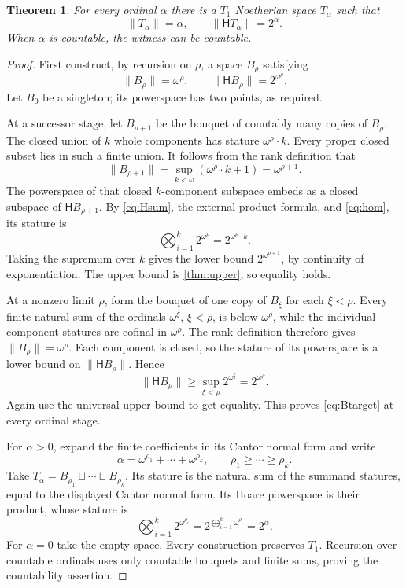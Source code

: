 \documentclass[11pt,a4paper]{article}
\newtheorem{theorem}{Theorem}[section]
\theoremstyle{definition}
\newcommand{\HH}{\mathsf H}
\newcommand{\st}[1]{\lVert #1\rVert}
\newcommand{\ds}{\mathbin{\sqcup}}
\newcommand{\natsum}{\mathop{\bigoplus}}
\newcommand{\natprod}{\mathop{\bigotimes}}
\numberwithin{equation}{section}
\begin{document}
\begin{theorem}\label{thm:sharpT1}
For every ordinal $\alpha$ there is a $T_1$ Noetherian space $T_\alpha$
such that
\[
 \st{T_\alpha}=\alpha,
 \qquad \st{\HH T_\alpha}=2^\alpha.
\]
When $\alpha$ is countable, the witness can be countable.
\end{theorem}
\begin{proof}
First construct, by recursion on $\rho$, a space $B_\rho$ satisfying
\begin{equation}\label{eq:Btarget}
 \st{B_\rho}=\omega^\rho,
 \qquad\st{\HH B_\rho}=2^{\omega^\rho}.
\end{equation}
Let $B_0$ be a singleton; its powerspace has two points, as required.

At a successor stage, let $B_{\rho+1}$ be the bouquet of countably many
copies of $B_\rho$.  The closed union of $k$ whole components has stature
$\omega^\rho\cdot k$.  Every proper closed subset lies in such a finite
union.  It follows from the rank definition that
\[
 \st{B_{\rho+1}}
 =\sup_{k<\omega}(\omega^\rho\cdot k+1)=\omega^{\rho+1}.
\]
The powerspace of that closed $k$-component subspace embeds as a closed
subspace of $\HH B_{\rho+1}$.  By \eqref{eq:Hsum}, the external product
formula, and \eqref{eq:hom}, its stature is
\[
 \natprod_{i=1}^k2^{\omega^\rho}=2^{\omega^\rho\cdot k}.
\]
Taking the supremum over $k$ gives the lower bound
$2^{\omega^{\rho+1}}$, by continuity of exponentiation.  The upper bound
is \cref{thm:upper}, so equality holds.

At a nonzero limit $\rho$, form the bouquet of one copy of $B_\xi$ for
each $\xi<\rho$.  Every finite natural sum of the ordinals
$\omega^\xi$, $\xi<\rho$, is below $\omega^\rho$, while the individual
component statures are cofinal in $\omega^\rho$.  The rank definition
therefore gives $\st{B_\rho}=\omega^\rho$.  Each component is closed,
so the stature of its powerspace is a lower bound on
$\st{\HH B_\rho}$.  Hence
\[
 \st{\HH B_\rho}\geq\sup_{\xi<\rho}2^{\omega^\xi}
 =2^{\omega^\rho}.
\]
Again use the universal upper bound to get equality.  This proves
\eqref{eq:Btarget} at every ordinal stage.

For $\alpha>0$, expand the finite coefficients in its Cantor normal form
and write
\[
 \alpha=\omega^{\rho_1}+\cdots+\omega^{\rho_k},
 \qquad\rho_1\geq\cdots\geq\rho_k.
\]
Take $T_\alpha=B_{\rho_1}\ds\cdots\ds B_{\rho_k}$.  Its stature is the
natural sum of the summand statures, equal to the displayed Cantor
normal form.  Its Hoare powerspace is their product, whose stature is
\[
 \natprod_{i=1}^k2^{\omega^{\rho_i}}
 =2^{\natsum_{i=1}^k\omega^{\rho_i}}=2^\alpha.
\]
For $\alpha=0$ take the empty space.  Every construction preserves
$T_1$.  Recursion over countable ordinals uses only countable bouquets
and finite sums, proving the countability assertion.
\end{proof}
\end{document}
